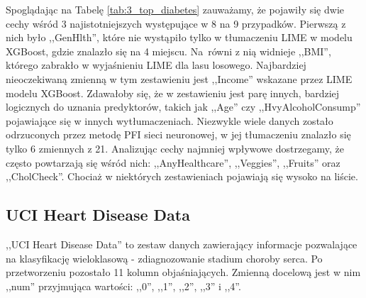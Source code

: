 Spoglądając na Tabelę \ref{tab:3_top_diabetes} zauważamy, że pojawiły się dwie cechy wśród 3 najistotniejszych występujące w 8 na 9 przypadków. Pierwszą z nich było ,,GenHlth'', które nie wystąpiło tylko w tłumaczeniu LIME w modelu XGBoost, gdzie znalazło się na 4 miejscu. Na~równi z nią widnieje ,,BMI'', którego zabrakło w wyjaśnieniu LIME dla lasu losowego. Najbardziej nieoczekiwaną zmienną w tym zestawieniu jest ,,Income'' wskazane przez LIME modelu XGBoost. Zdawałoby się, że w zestawieniu jest parę innych, bardziej logicznych do uznania predyktorów, takich jak ,,Age'' czy ,,HvyAlcoholConsump'' pojawiające się w innych wytłumaczeniach. 
Niezwykle wiele danych zostało odrzuconych przez metodę PFI sieci neuronowej, w jej tłumaczeniu znalazło się tylko 6 zmiennych z 21. Analizując cechy najmniej wpływowe dostrzegamy, że często powtarzają się wśród nich: ,,AnyHealthcare'', ,,Veggies'', ,,Fruits'' oraz ,,CholCheck''. Chociaż w niektórych zestawieniach pojawiają się wysoko na liście.


\subsection{UCI Heart Disease Data}
,,UCI Heart Disease Data'' to zestaw danych zawierający informacje pozwalające na klasyfikację wieloklasową - zdiagnozowanie stadium choroby serca. Po przetworzeniu pozostało 11 kolumn objaśniających. Zmienną docelową jest w nim ,,num'' przyjmująca wartości: ,,0'', ,,1'', ,,2'', ,,3'' i ,,4''.  
